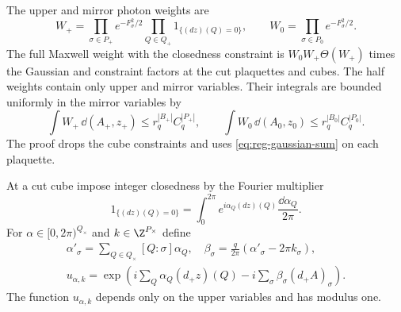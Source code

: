 The upper and mirror photon weights are
\begin{equation}\label{eq:reg-half-photon-weights}
 W_+=\prod_{\sigma\in P_+}e^{-F_\sigma^2/2}
               \prod_{Q\in Q_+}1_{\{(dz)(Q)=0\}},
 \qquad W_0=\prod_{\sigma\in P_0}e^{-F_\sigma^2/2}.
\end{equation}
The full Maxwell weight with the closedness constraint is
$W_0W_+\Theta(W_+)$ times the Gaussian and constraint factors at
the cut plaquettes and cubes. The half weights contain only upper
and mirror variables. Their integrals are bounded uniformly in the
mirror variables by
\[
 \int W_+\,\dd(A_+,z_+)
       \le r_q^{|B_+|}C_q^{|P_+|},\qquad
 \int W_0\,\dd(A_0,z_0)
       \le r_q^{|B_0|}C_q^{|P_0|}.
\]
The proof drops the cube constraints and uses
\eqref{eq:reg-gaussian-sum} on each plaquette.

At a cut cube impose integer closedness by the Fourier multiplier
\[
 1_{\{(dz)(Q)=0\}}
   =\int_0^{2\pi}e^{i\alpha_Q(dz)(Q)}\frac{\dd\alpha_Q}{2\pi}.
\]
For $\alpha\in[0,2\pi)^{Q_\times}$ and
$k\in\Z^{P_\times}$ define
\begin{equation}\label{eq:reg-dual-crossing-variables}
 \begin{aligned}
 \alpha'_\sigma=\sum_{Q\in Q_\times}[Q:\sigma]\alpha_Q,
 \quad \beta_\sigma=\frac{q}{2\pi}(\alpha'_\sigma-2\pi k_\sigma),
 \\
 u_{\alpha,k}
 =\exp\left(i\sum_Q\alpha_Q(d_+z)(Q)
                  -i\sum_\sigma\beta_\sigma(d_+A)_\sigma\right).
 \end{aligned}
\end{equation}
The function $u_{\alpha,k}$ depends only on the upper variables and
has modulus one.

